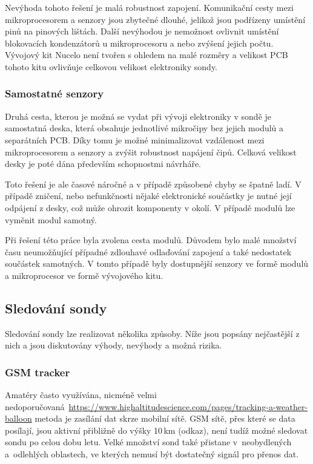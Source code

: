 \documentclass[twoside]{ctuthesis}
\theoremstyle{plain}
\theoremstyle{definition}
\theoremstyle{note}
\begin{document}
	Nevýhoda tohoto řešení je malá robustnost zapojení. Komunikační cesty mezi mikroprocesorem a senzory jsou zbytečné dlouhé, jelikož jsou podřízeny umístění pinů na pinových lištách. Další nevýhodou je nemožnost ovlivnit umístění blokovacích kondenzátorů u mikroprocesoru a nebo zvýšení jejich počtu. Vývojový kit Nucelo není tvořen s ohledem na malé rozměry a velikost PCB tohoto kitu ovlivňuje celkovou velikost elektroniky sondy.

	\subsubsection{Samostatné senzory}
	Druhá cesta, kterou je možná se vydat při vývoji elektroniky v sondě je samostatná deska, která obsahuje jednotlivé mikročipy bez jejich modulů a separátních PCB. Díky tomu je možné minimalizovat vzdálenost mezi mikroprocesorem a senzory a zvýšit robustnost napájení čipů. Celková velikost desky je poté dána především schopnostmi návrháře. 

	Toto řešení je ale časové náročné a v případě způsobené chyby se špatně ladí. V případě zničení, nebo nefunkčnosti nějaké elektronické součástky je nutné její odpájení z desky, což může ohrozit komponenty v okolí. V případě modulů lze vyměnit modul samotný.

	Při řešení této práce byla zvolena cesta modulů. Důvodem bylo malé množství času neumožňující případné zdlouhavé odlaďování zapojení a také nedostatek součástek samotných. V tomto případě byly dostupnější senzory ve formě modulů a mikroprocesor ve formě vývojového kitu. 

	
		\subsection{Sledování sondy}
		Sledování sondy lze realizovat několika způsoby. Níže jsou popsány nejčastější z nich a jsou diskutovány výhody, nevýhody a možná rizika.

			\subsubsection{GSM tracker}
			Amatéry často využívána, nicméně velmi nedoporučovaná~\url{https://www.highaltitudescience.com/pages/tracking-a-weather-balloon} metoda je zasílání dat skrze mobilní sítě. GSM sítě, přes které se data posílají, jsou aktivní přibližně do výšky 10\,km (odkaz), není tudíž možné sledovat sondu po celou dobu letu. Velké množství sond také přistane v~neobydlených a~odlehlých oblastech, ve kterých nemusí být dostatečný signál pro přenos dat.
\end{document}
